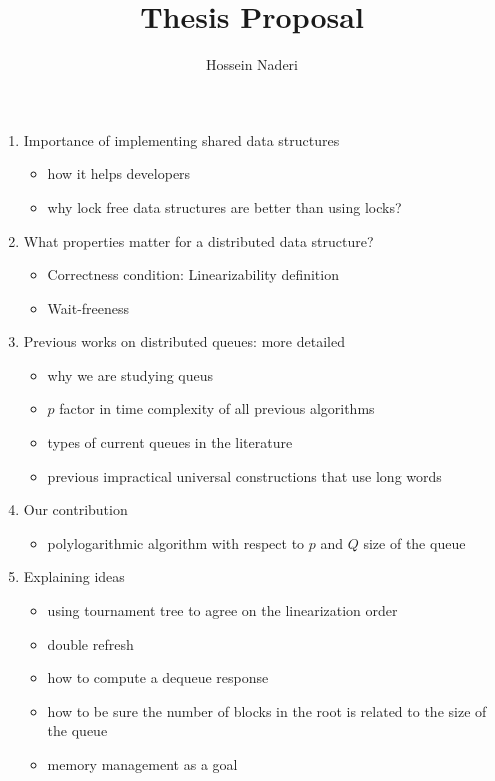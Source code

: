 \documentclass{article}
\begin{document}
\title{Thesis Proposal}
\author{Hossein Naderi}
\maketitle

\begin{enumerate}
  \item Importance of implementing shared data structures
\begin{itemize}
  \item how it helps developers
  \item why lock free data structures are better than using locks?
\end{itemize} 
  \item  What properties matter for a distributed data structure?
\begin{itemize}
  \item Correctness condition: Linearizability definition
  \item Wait-freeness
\end{itemize} 
  \item Previous works on distributed queues: more detailed
\begin{itemize}
  \item why we are studying queus
  \item $p$ factor in time complexity of all previous algorithms
  \item types of current queues in the literature
  \item previous impractical universal constructions that use long words
\end{itemize}
  \item Our contribution
\begin{itemize}
  \item polylogarithmic algorithm with respect to $p$ and $Q$ size of the queue
\end{itemize}
  \item Explaining ideas
\begin{itemize}
  \item using tournament tree to agree on the linearization order
  \item double refresh
  \item how to compute a dequeue response
  \item how to be sure the number of blocks in the root is related to the size of the queue
  \item memory management as a goal
\end{itemize}
\end{enumerate}
\end{document}

